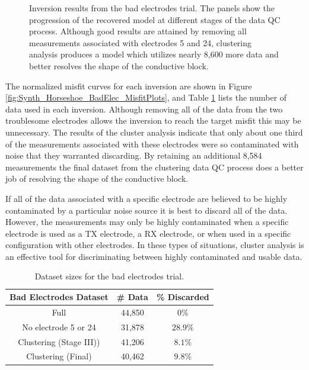 \documentclass[final,authoryear,5p,times,twocolumn]{elsarticle}
\begin{document}
\begin{figure} [!ht]
\begin{center}
{       } %
    \end{center}
\caption{Inversion results from the bad electrodes trial. The panels show the progression of the recovered model at different stages of the data QC process. Although good results are attained by removing all measurements associated with electrodes 5 and 24, clustering analysis produces a model which utilizes nearly 8,600 more data and better resolves the shape of the conductive block.}
\label{fig:Synth_Horseshoe_BadElec}
\end{figure}

The normalized misfit curves for each inversion are shown in Figure \ref{fig:Synth_Horseshoe_BadElec_MisfitPlots}, and Table \ref{tab:Synth_BadElec_Sizes} lists the number of data used in each inversion. Although removing all of the data from the two troublesome electrodes allows the inversion to reach the target misfit this may be unnecessary. The results of the cluster analysis indicate that only about one third of the measurements associated with these electrodes were so contaminated with noise that they warranted discarding. By retaining an additional 8,584 measurements the final dataset from the clustering data QC process does a better job of resolving the shape of the conductive block. 

If all of the data associated with a specific electrode are believed to be highly contaminated by a particular noise source it is best to discard all of the data. However, the measurements may only be highly contaminated when a specific electrode is used as a TX electrode, a RX electrode, or when used in a specific configuration with other electrodes. In these types of situations, cluster analysis is an effective tool for discriminating between highly contaminated and usable data.     

\begin{table}[!ht]
\small
\begin{center}
  \begin{tabular}{| c | c | c |}
    \hline
    \bf{Bad Electrodes Dataset} & \bf{\# Data} &  \bf{\% Discarded} \\
    \hline
    Full & 44,850 & $0 \%$\\
    \hline
    No electrode 5 or 24 & 31,878 & $28.9 \%$\\ %
    \hline
    Clustering (Stage III)) & 41,206 & $8.1 \%$\\
    \hline
    Clustering (Final) & 40,462 & $9.8 \%$\\ %
    \hline   
  \end{tabular}
\caption{Dataset sizes for the bad electrodes trial.}
\label{tab:Synth_BadElec_Sizes}
\end{center}
\end{table}    
\end{document}
